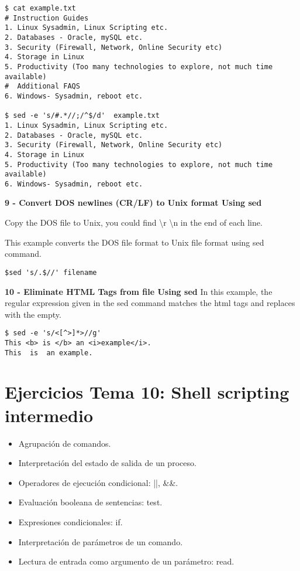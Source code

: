 \documentclass[a4paper,11pt,spanish]{article} %
\newenvironment{myscriptlisting}
{\begin{list}{}{\setlength{\leftmargin}{1em}}\item\scriptsize\bfseries}
{\end{list}}
\begin{document}
\begin{myscriptlisting}
 \begin{verbatim}
$ cat example.txt
# Instruction Guides
1. Linux Sysadmin, Linux Scripting etc.
2. Databases - Oracle, mySQL etc.
3. Security (Firewall, Network, Online Security etc)
4. Storage in Linux
5. Productivity (Too many technologies to explore, not much time available)
#  Additional FAQS
6. Windows- Sysadmin, reboot etc.  

$ sed -e 's/#.*//;/^$/d'  example.txt
1. Linux Sysadmin, Linux Scripting etc.
2. Databases - Oracle, mySQL etc.
3. Security (Firewall, Network, Online Security etc)
4. Storage in Linux
5. Productivity (Too many technologies to explore, not much time available)
6. Windows- Sysadmin, reboot etc.
 \end{verbatim}
\end{myscriptlisting}

\textbf{9 - Convert DOS newlines (CR/LF) to Unix format Using sed}

Copy the DOS file to Unix, you could find \textbackslash r \textbackslash n in
the end of each line.

This example converts the DOS file format to Unix file format using sed command.

\begin{myscriptlisting}
 \begin{verbatim}
$sed 's/.$//' filename
 \end{verbatim}
\end{myscriptlisting}

\textbf{10 - Eliminate HTML Tags from file Using sed}
In this example, the regular expression given in the sed command matches the
html tags and replaces with the empty.

\begin{myscriptlisting}
 \begin{verbatim}
$ sed -e 's/<[^>]*>//g'
This <b> is </b> an <i>example</i>.
This  is  an example.
 \end{verbatim}
\end{myscriptlisting}

\cite{thegeekstuff3}

\pagebreak

\section{Ejercicios Tema 10: Shell scripting intermedio}

\begin{itemize}
 \item Agrupación de comandos.
 \item Interpretación del estado de salida de un proceso.
 \item Operadores de ejecución condicional: ||, \&\&.
 \item Evaluación booleana de sentencias: test.
 \item Expresiones condicionales: if.
 \item Interpretación de parámetros de un comando.
 \item Lectura de entrada como argumento de un parámetro: read.
 \end{itemize}
\end{document}
